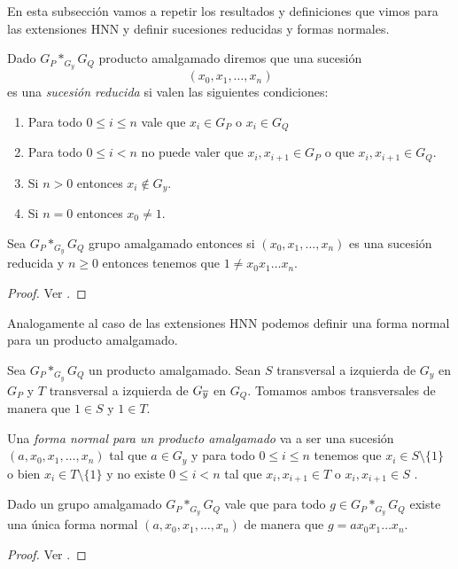 \documentclass[tesis.tex]{subfiles}
\begin{document}
En esta subsección vamos a repetir los resultados y definiciones que vimos para las extensiones HNN y definir sucesiones reducidas y formas normales.

\begin{deff}\label{deff_amalgamado_fn}
	Dado $G_P \ast_{G_y} G_Q$ producto amalgamado diremos que una sucesión
	\[
	(x_0,x_1,\dots, x_n)
	\]
	es una \emph{sucesión reducida} si valen las siguientes condiciones:
	\begin{enumerate}
		\item Para todo $0 \le i \le n$ vale que $x_{i} \in G_{P}$ o $x_i \in G_Q$
		\item Para todo $0 \le i < n$ no puede valer que $x_i,x_{i+1} \in G_P$ o que $x_i,x_{i+1} \in G_Q$.
		\item Si $n > 0$ entonces $x_i \notin G_y$.
		\item Si $n = 0$ entonces $x_0 \neq 1$.
	\end{enumerate}
\end{deff}


\begin{teo}\label{coro_amalgamado_neq_1}
	Sea $G_P \ast_{G_y} G_Q$ grupo amalgamado entonces si $(x_0,x_1,\dots,x_n)$ es una sucesión reducida y $n \ge 0$ entonces tenemos que $1 \neq x_0x_1\dots x_n$.
\end{teo}
\begin{proof}
	Ver \cite[pp.187-188]{lyndon1977combinatorial}.
\end{proof}

Analogamente al caso de las extensiones HNN podemos definir una forma normal para un producto amalgamado.

\begin{deff}
	Sea $G_P \ast_{G_y} G_Q$ un producto amalgamado.
	Sean $S$ transversal a izquierda de $G_{y}$ en $G_P$ y $T$ transversal a izquierda de $G_{\overline y}$ en $G_{Q}$.
	Tomamos ambos transversales de manera que $1 \in S$ y $1 \in T$.
	
	Una \emph{forma normal para un producto amalgamado} va a ser una sucesión
	$(a,x_0,x_1,\dots, x_n)$ tal que $a \in G_{y}$ y para todo $0\le  i \le n$ tenemos que $x_{i} \in S \setminus \{ 1 \}$ o bien $x_{i} \in T \setminus \{ 1 \}$ y no 
	existe $ 0 \le i  < n$ tal que  $x_{i}, x_{i+1} \in T$ o $x_{i}, x_{i+1} \in S$ .	
\end{deff}

\begin{prop}\label{prop_amalgamado_formanormal}
	Dado un grupo amalgamado $G_P \ast_{G_y} G_Q$
	vale que para todo $g \in G_P \ast_{G_y} G_Q$ 
	existe una única forma normal $(a,x_0,x_1,\dots,x_n)$ de manera que $g= ax_0x_1\dots x_n$.
\end{prop}
\begin{proof}
	Ver \cite[p.187]{lyndon1977combinatorial}.
\end{proof}
\end{document}
